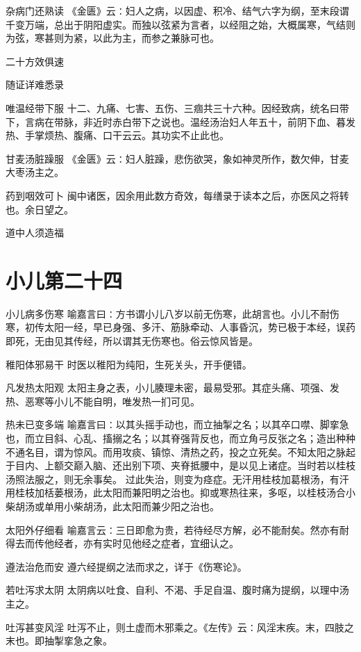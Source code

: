 \documentclass[a4paper,12pt,UTF8,twoside]{ctexbook}
\begin{document}
    杂病门还熟读
    《金匮》云∶妇人之病，以因虚、积冷、结气六字为纲，至末段谓千变万端，总出于阴阳虚实。而独以弦紧为言者，以经阻之始，大概属寒，气结则为弦，寒甚则为紧，以此为主，而参之兼脉可也。
    
    二十方效俱速
    
    随证详难悉录
    
    唯温经带下服
    十二、九痛、七害、五伤、三痼共三十六种。因经致病，统名曰带下，言病在带脉，非近时赤白带下之说也。温经汤治妇人年五十，前阴下血、暮发热、手掌烦热、腹痛、口干云云。其功实不止此也。
    
    甘麦汤脏躁服
    《金匮》云∶妇人脏躁，悲伤欲哭，象如神灵所作，数欠伸，甘麦大枣汤主之。
    
    药到咽效可卜
    闽中诸医，因余用此数方奇效，每缮录于读本之后，亦医风之将转也。余日望之。
    
    道中人须造福
    \section{小儿第二十四}
      小儿病多伤寒
    喻嘉言曰∶方书谓小儿八岁以前无伤寒，此胡言也。小儿不耐伤寒，初传太阳一经，早已身强、多汗、筋脉牵动、人事昏沉，势已极于本经，误药即死，无由见其传经，所以谓其无伤寒也。俗云惊风皆是。
    
    稚阳体邪易干
    时医以稚阳为纯阳，生死关头，开手便错。
    
    凡发热太阳观
    太阳主身之表，小儿腠理未密，最易受邪。其症头痛、项强、发热、恶寒等小儿不能自明，唯发热一扪可见。
    
    热未已变多端
    喻嘉言曰∶以其头摇手动也，而立抽掣之名；以其卒口噤、脚挛急也，而立目斜、心乱、搐搦之名；以其脊强背反也，而立角弓反张之名；造出种种不通名目，谓为惊风。而用攻痰、镇惊、清热之药，投之立死矣。不知太阳之脉起于目内、上额交巅入脑、还出别下项、夹脊抵腰中，是以见上诸症。当时若以桂枝汤照法服之，则无余事矣。
    过此失治，则变为痉症。无汗用桂枝加葛根汤，有汗用桂枝加栝蒌根汤，此太阳而兼阳明之治也。抑或寒热往来，多呕，以桂枝汤合小柴胡汤或单用小柴胡汤，此太阳而兼少阳之治也。
    
    太阳外仔细看
    喻嘉言云∶三日即愈为贵，若待经尽方解，必不能耐矣。然亦有耐得去而传他经者，亦有实时见他经之症者，宜细认之。
    
    遵法治危而安
    遵六经提纲之法而求之，详于《伤寒论》。
    
    若吐泻求太阴
    太阴病以吐食、自利、不渴、手足自温、腹时痛为提纲，以理中汤主之。
    
    吐泻甚变风淫
    吐泻不止，则土虚而木邪乘之。《左传》云∶风淫末疾。末，四肢之末也。即抽掣挛急之象。
    
\end{document}
